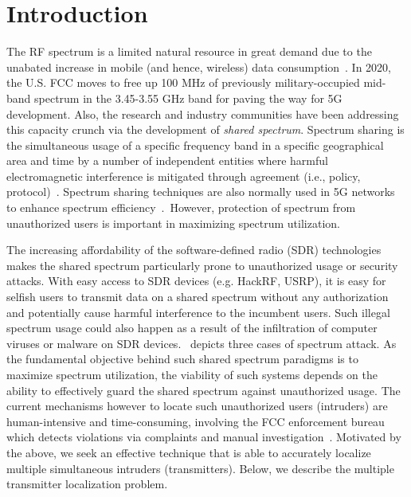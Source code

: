 \section{Introduction}
\label{sec:wowmom-intro}

The RF spectrum is a limited natural resource in great demand due to the
unabated increase in mobile (and hence, wireless) data
consumption~\cite{Jeffrey14,sigcomm21-5G}.
In 2020, the U.S. FCC moves to free up 100 MHz of previously military-occupied mid-band spectrum in the 3.45-3.55 GHz band for paving the way for 5G development. 
Also, the research and industry communities have been addressing this capacity crunch via the development of {\em shared spectrum}.
Spectrum sharing is the simultaneous usage of a specific frequency band in a specific geographical area and time by a number of independent entities where harmful electromagnetic interference is mitigated through agreement (i.e., policy, protocol)~\cite{dod20-spectrum}. 
Spectrum sharing techniques are also normally used in 5G networks to enhance spectrum efficiency~\cite{survey-specshare}.~However, protection of spectrum from unauthorized
users is important in maximizing spectrum utilization.

The increasing affordability of the software-defined radio (SDR)
technologies makes the shared spectrum particularly prone to
unauthorized usage or security attacks. With easy access to SDR
devices (e.g. HackRF, USRP), it is easy for selfish users to transmit data
on a shared spectrum without any authorization and potentially cause
harmful interference to the incumbent users.  Such illegal spectrum
usage could also happen as a result of the infiltration of computer viruses
or malware on SDR devices.~\cite{survey-specshare} depicts three cases of spectrum attack.
As the fundamental objective behind such
shared spectrum paradigms is to maximize spectrum utilization, the
viability of such systems depends on the ability to effectively guard
the shared spectrum against unauthorized usage.  The current
mechanisms however to locate such unauthorized users (intruders) are
human-intensive and time-consuming, involving the FCC enforcement bureau
which detects violations via complaints and manual
investigation~\cite{mobicom17-splot}. 
Motivated by the above, we seek an effective
technique that is able to accurately localize multiple simultaneous
intruders (transmitters). Below, we describe the multiple transmitter localization problem.

